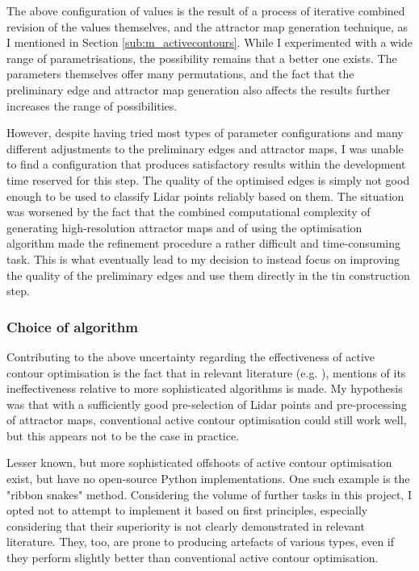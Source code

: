 The above configuration of values is the result of a process of iterative combined revision of the values themselves, and the attractor map generation technique, as I mentioned in Section \ref{sub:m_activecontours}. While I experimented with a wide range of parametrisations, the possibility remains that a better one exists. The parameters themselves offer many permutations, and the fact that the preliminary edge and attractor map generation also affects the results further increases the range of possibilities.  

However, despite having tried most types of parameter configurations and many different adjustments to the preliminary edges and attractor maps, I was unable to find a configuration that produces satisfactory results within the development time reserved for this step. The quality of the optimised edges is simply not good enough to be used to classify Lidar points reliably based on them. The situation was worsened by the fact that the combined computational complexity of generating high-resolution attractor maps and of using the optimisation algorithm made the refinement procedure a rather difficult and time-consuming task. This is what eventually lead to my decision to instead focus on improving the quality of the preliminary edges and use them directly in the \ac{tin} construction step. 

\subsubsection{Choice of algorithm}

Contributing to the above uncertainty regarding the effectiveness of active contour optimisation is the fact that in relevant literature (e.g. \cite{boyko_funkhauser_2011}), mentions of its ineffectiveness relative to more sophisticated algorithms is made. My hypothesis was that with a sufficiently good pre-selection of Lidar points and pre-processing of attractor maps, conventional active contour optimisation could still work well, but this appears not to be the case in practice.

Lesser known, but more sophisticated offshoots of active contour optimisation exist, but have no open-source Python implementations. One such example is the "ribbon snakes" method. Considering the volume of further tasks in this project, I opted not to attempt to implement it based on first principles, especially considering that their superiority is not clearly demonstrated in relevant literature. They, too, are prone to producing artefacts of various types, even if they perform slightly better than conventional active contour optimisation.

